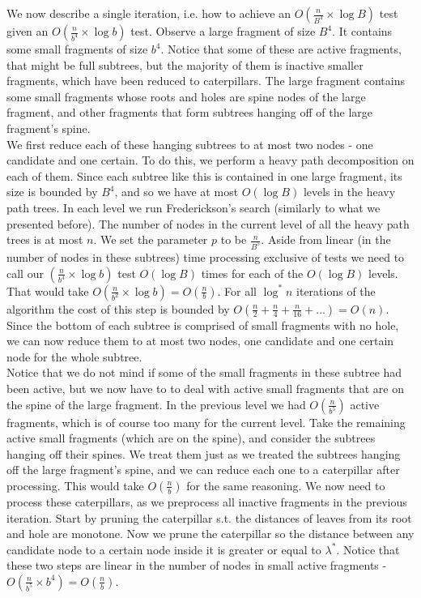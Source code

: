 \documentclass[11pt,a4paper]{article}
\theoremstyle{definition}
\theoremstyle{remark}
\begin{document}
We now describe a single iteration, i.e. how to achieve an $O(\frac{n}{B^4} \times \log B)$ test given an $O(\frac{n}{b^4} \times \log b)$ test.
Observe a large fragment of size $B^4$. It contains some small fragments of size $b^4$. Notice that some of these are active fragments, that might be full subtrees, but the majority of them is inactive smaller fragments, which have been reduced to caterpillars. The large fragment contains some small fragments whose roots and holes are spine nodes of the large fragment, and other fragments that form subtrees hanging off of the large fragment's spine.\\ %

We first reduce each of these hanging subtrees to at most two nodes - one candidate and one certain. To do this, we perform a heavy path decomposition on each of them. Since each subtree like this is contained in one large fragment, its size is bounded by $B^4$, and so we have at most $O(\log B)$ levels in the heavy path trees. In each level we run Frederickson's search (similarly to what we presented before). The number of nodes in the current level of all the heavy path trees is at most $n$. We set the parameter $p$ to be $\frac{n}{B^5}$. Aside from linear (in the number of nodes in these subtrees) time processing exclusive of tests we need to call our $(\frac{n}{b^4} \times \log b)$ test $O(\log B)$ times for each of the $O(\log B)$ levels. That would take $O(\frac{n}{b^2} \times \log b) = O(\frac{n}{b})$. For all $\log ^*n$ iterations of the algorithm the cost of this step is bounded by $O(\frac{n}{2}+\frac{n}{4}+\frac{n}{16}+...) = O(n)$.\\
Since the bottom of each subtree is comprised of small fragments with no hole, we can now reduce them to at most two nodes, one candidate and one certain node for the whole subtree.\\
Notice that we do not mind if some of the small fragments in these subtree had been active, but we now have to to deal with active small fragments  that are on the spine of the large fragment. In the previous level we had $O(\frac{n}{b^5})$ active fragments, which is of course too many for the current level. Take the remaining active small fragments (which are on the spine), and consider the subtrees hanging off their spines. We treat them just as we treated the subtrees hanging off the large fragment's spine, and we can reduce each one to a caterpillar after processing. This would take $O(\frac{n}{b})$ for the same reasoning. We now need to process these caterpillars, as we preprocess all inactive fragments in the previous iteration. Start by pruning the caterpillar s.t. the distances of leaves from its root and hole are monotone. Now we prune the caterpillar so the distance between any candidate node to a certain node inside it is greater or equal to $\lambda^*$. Notice that these two steps are linear in the number of nodes in small active fragments - $O(\frac{n}{b^5} \times b^4)=O(\frac{n}{b})$.\\
\end{document}

